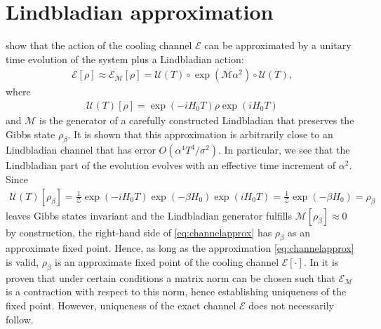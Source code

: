 \documentclass[12pt,a4paper]{article}
\newcommand{\SA}[1]{{\color{orange}{[SA: #1]}}}
\begin{document}
\section{Lindbladian approximation}\label{sec:lindblad}
\citet{ding2025} show that the action of the cooling channel $\mathcal{E}$ can be approximated by a unitary time evolution of the system plus a Lindbladian action:
\begin{align}\label{eq:channelapprox}
\mathcal{E}[\rho] \approx \mathcal{E}_{\mathcal{M}}[\rho]=\mathcal{U}(T) \circ \exp{\left( \mathcal{M}\alpha^2 \right)} \circ \mathcal{U}(T) ,   
\end{align}
where 
\begin{align}
\mathcal{U}(T)[\rho] = \exp(-iH_0T)\rho \exp(iH_0T)
\end{align}
and $\mathcal{M}$ is the generator of a carefully constructed Lindbladian that preserves the Gibbs state $\rho_{\beta}$. It is shown that this approximation is arbitrarily close to an Lindbladian channel that has error $O({\alpha^4 T^4}/{\sigma^2})$. In particular, we see that the Lindbladian part of the evolution evolves with an effective time increment of $\alpha^2$. Since 
\begin{align}
\mathcal{U}(T)[\rho_{\beta}] = \frac{1}{\mathcal{Z}}\exp(-iH_0T)\exp(-\beta H_0) \exp(iH_0T) = \frac{1}{\mathcal{Z}}\exp(-\beta H_0) = \rho_{\beta}
\end{align} leaves Gibbs states invariant and the Lindbladian generator fulfills $\mathcal{M}[\rho_{\beta}]\approx 0$ by construction, the right-hand side of \cref{eq:channelapprox} has $\rho_{\beta}$ as an approximate fixed point. Hence, as long as the approximation  \cref{eq:channelapprox} %
is valid, $\rho_{\beta}$ is an approximate fixed point of the cooling channel $\mathcal{E}[\cdot]$.  In \citet{ding2025} it 
is proven that under certain conditions a matrix norm can be chosen such that $\mathcal{E}_{\mathcal{M}}$ is a contraction with respect to this norm, hence establishing uniqueness of the fixed point. However, uniqueness of the exact channel $\mathcal{E}$ does not necessarily follow.
\end{document}
